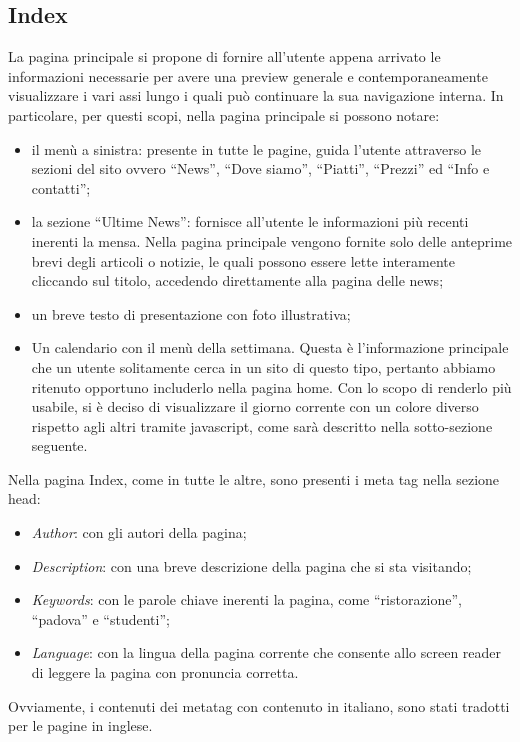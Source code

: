 \documentclass[10pt,a4paper,onecolumn]{article}
\begin{document}
\subsection{Index}

La pagina principale si propone di fornire all'utente appena arrivato le informazioni necessarie per avere una preview generale e contemporaneamente visualizzare i vari assi lungo i quali può continuare la sua navigazione interna. In particolare, per questi scopi, nella pagina principale si possono notare:
\begin{itemize}
 \item il menù a sinistra: presente in tutte le pagine, guida l'utente attraverso le sezioni del sito ovvero ``News'', ``Dove siamo'', ``Piatti'', ``Prezzi'' ed ``Info e contatti'';
 \item la sezione ``Ultime News'': fornisce all'utente le informazioni più recenti inerenti la mensa. Nella pagina principale vengono fornite solo delle anteprime brevi degli articoli o notizie, le quali possono essere lette interamente cliccando sul titolo, accedendo direttamente alla pagina delle news;
 \item un breve testo di presentazione con foto illustrativa;
 \item Un calendario con il menù della settimana. Questa è l'informazione principale che un utente solitamente cerca in un sito di questo tipo, pertanto abbiamo ritenuto opportuno includerlo nella pagina home. Con lo scopo di renderlo più usabile, si è deciso di visualizzare il giorno corrente con un colore diverso rispetto agli altri tramite javascript, come sarà descritto nella sotto-sezione seguente.
\end{itemize}
Nella pagina Index, come in tutte le altre, sono presenti i meta tag nella sezione head:
\begin{itemize}
 \item \textit{Author}: con gli autori della pagina;
 \item \textit{Description}: con una breve descrizione della pagina che si sta visitando;
 \item \textit{Keywords}: con le parole chiave inerenti la pagina, come ``ristorazione'', ``padova'' e ``studenti'';
 \item \textit{Language}: con la lingua della pagina corrente che consente allo screen reader di leggere la pagina con pronuncia corretta.
\end{itemize}
Ovviamente, i contenuti dei metatag con contenuto in italiano, sono stati tradotti per le pagine in inglese.
\end{document}
